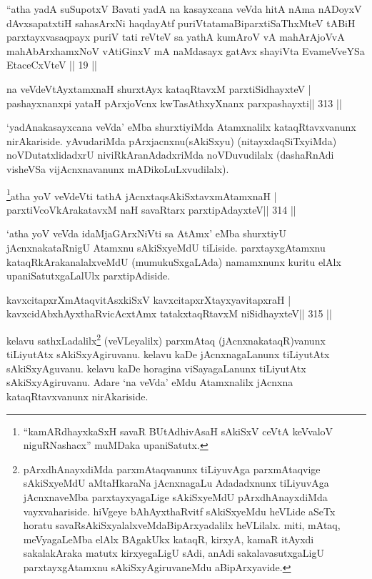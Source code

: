 \begin{kandikeshl}
``atha yadA suSupotxV Bavati yadA na kasayxcana veVda
hitA nAma nADoyxV dAvxsapatxtiH sahasArxNi haqdayAtf
puriVtatamaBiparxtiSaThxMteV tABiH parxtayxvasaqpayx puriV
tati reVteV sa yathA kumAroV vA mahArAjoVvA 
mahAbArxhamxNoV vA\s tiGinxV mA naMdasayx gatAvx shayiVta 
EvameVveYSa EtaceCxVteV || 19 ||
\end{kandikeshl}


\begin{shl}
na veVdeVtAyxtamxnaH shurxtAyx kataqRtavxM parxtiSidhayxteV |
pashayxnanxpi yataH pArxjoVcnx kwTasAthxyXnanx parxpashayxti\hfill || 313 ||
\end{shl}

\begin{artha}
`yadAnakasayxcana veVda' eMba shurxtiyiMda Atamxnalilx kataqRtavxvanunx  nirAkariside. yAvudariMda pArxjacnxnu(sAkiSxyu) (nitayxdaqSiTxyiMda)  noVDutatxlidadxrU niviRkAranAdadxriMda noVDuvudilalx (dashaRnAdi visheVSa vijAcnxnavanunx mADikoLuLxvudilalx).
\end{artha}


\begin{shl}
\footnote{``kamARdhayxkaSxH savaR BUtAdhivAsaH sAkiSxV ceVtA keVvaloV niguRNashacx'' muMDaka upaniSatutx.}atha yoV veVdeVti tathA jAcnxtaqsAkiSxtavxmAtamxnaH |
parxtiVcoV\s kArakatavxM naH savaRtarx parxtipAdayxteV\hfill || 314 ||
\end{shl}

\begin{artha}
`atha yoV veVda idaMjaGArxNiVti sa AtAmx' eMba shurxtiyU jAcnxnakataRnigU  Atamxnu sAkiSxyeMdU tiLiside. parxtayxgAtamxnu kataqRkArakanalalxveMdU (mumukuSxgaLAda) namamxnunx kuritu elAlx upaniSatutxgaLalUlx parxtipAdiside.
\end{artha}


\begin{shl}
kavxcitapxrXmAtaqvitAsxkiSxV kavxcitapxrXtayxyavitapxraH |
kavxcidAbxhAyxthaRvicAcx\s\s tAmx tatakxtaqRtavxM niSidhayxteV\hfill || 315 ||
\end{shl}

\begin{artha}
kelavu sathxLadalilx\footnote{pArxdhAnayxdiMda parxmAtaqvanunx  tiLiyuvAga parxmAtaqvige sAkiSxyeMdU aMtaHkaraNa jAcnxnagaLu Adadadxnunx  tiLiyuvAga jAcnxnaveMba parxtayxyagaLige sAkiSxyeMdU pArxdhAnayxdiMda  vayxvahariside. hiVgeye bAhAyxthaRvitf sAkiSxyeMdu heVLide aSeTx horatu  savaRsAkiSxyalalxveMdaBipArxyadalilx heVLilalx. miti, mAtaq, meVyagaLeMba elAlx BAgakUkx kataqR, kirxyA, kamaR itAyxdi sakalakAraka matutx kirxyegaLigU sAdi, anAdi sakalavasutxgaLigU parxtayxgAtamxnu sAkiSxyAgiruvaneMdu aBipArxyavide.} (veVLeyalilx) parxmAtaq (jAcnxnakataqR)vanunx tiLiyutAtx sAkiSxyAgiruvanu. kelavu kaDe jAcnxnagaLanunx tiLiyutAtx sAkiSxyAguvanu. kelavu kaDe horagina viSayagaLanunx tiLiyutAtx sAkiSxyAgiruvanu. Adare `na veVda' eMdu Atamxnalilx jAcnxna kataqRtavxvanunx nirAkariside.
\end{artha}

